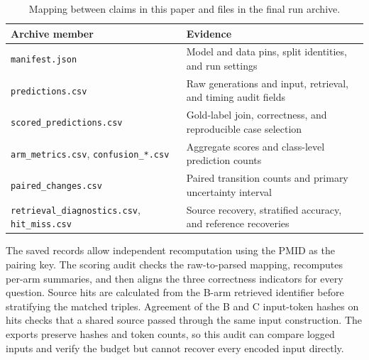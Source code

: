\documentclass[manuscript,nonacm]{acmart}
\begin{document}
\begin{table}[htbp]
\caption{Mapping between claims in this paper and files in the final run archive.}
\centering
\begin{tabular}{@{}lp{.51\linewidth}@{}}
\toprule
Archive member & Evidence\\
\midrule
\texttt{manifest.json} & Model and data pins, split identities, and run settings\\
\texttt{predictions.csv} & Raw generations and input, retrieval, and timing audit fields\\
\texttt{scored\_predictions.csv} & Gold-label join, correctness, and reproducible case selection\\
\texttt{arm\_metrics.csv}, \texttt{confusion\_*.csv} & Aggregate scores and class-level prediction counts\\
\texttt{paired\_changes.csv} & Paired transition counts and primary uncertainty interval\\
\texttt{retrieval\_diagnostics.csv}, \texttt{hit\_miss.csv} & Source recovery, stratified accuracy, and reference recoveries\\
\bottomrule
\end{tabular}
\end{table}

The saved records allow independent recomputation using the PMID as the pairing key. The scoring audit checks the raw-to-parsed mapping, recomputes per-arm summaries, and then aligns the three correctness indicators for every question. Source hits are calculated from the B-arm retrieved identifier before stratifying the matched triples. Agreement of the B and C input-token hashes on hits checks that a shared source passed through the same input construction. The exports preserve hashes and token counts, so this audit can compare logged inputs and verify the budget but cannot recover every encoded input directly.

\clearpage


\end{document}

